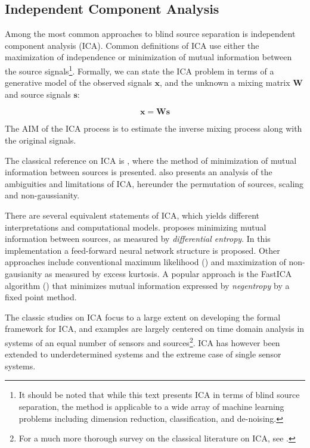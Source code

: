 \documentclass[11pt, oneside, a4paper]{report}
\begin{document}
\subsection{Independent Component Analysis} %

Among the most common approaches to blind source separation is
independent component analysis (ICA). Common definitions of ICA use
either the maximization of independence or minimization of mutual information between the source
signals\footnote{It should be noted that while this text presents ICA
  in terms of blind source separation, the method is applicable to a
  wide array of machine learning problems including dimension
  reduction, classification, and de-noising.}. Formally, we can state
the ICA problem in terms of a generative model of the observed signals
$\mathbf{x}$, and the unknown a mixing matrix $\mathbf{W}$ and source
signals $\mathbf{s}$:


\begin{equation}
  \mathbf{x} =   \mathbf{W}  \mathbf{s}
\end{equation}

The AIM of the ICA process is to estimate the inverse mixing process
along with the original signals.

The classical reference on ICA
is \cite{comon94}, where the method of minimization of mutual
information between sources is presented. \cite{comon94} also presents an
analysis of the ambiguities and limitations of ICA, hereunder the permutation of
sources, scaling and non-gaussianity. 

There are several equivalent statements of ICA, which yields different
interpretations and computational models.
\cite{bellSejnowski95} proposes minimizing mutual information between
sources, as measured by \emph{differential entropy}. In this
implementation a feed-forward neural network structure is proposed.
Other approaches include conventional maximum likelihood (\cite{pearlmutterParra}) and maximization of
non-gausianity as measured by excess kurtosis. A popular approach is
the  FastICA algorithm (\cite{fastICA}) that minimizes mutual
information expressed by \emph{negentropy} by a fixed point method. 

The classic studies on ICA focus to a large extent on developing the
formal framework for ICA, and examples are largely centered on time
domain analysis in systems of an equal number of sensors and
sources\footnote{For a much more thorough survey on the classical literature 
on ICA, see \cite{hyvarinen2001}.}. ICA has however been extended to underdetermined systems and
the extreme case of single sensor systems. 
\end{document}
